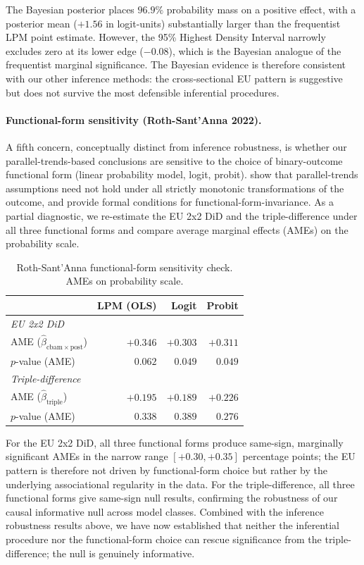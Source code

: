 \documentclass[11pt,a4paper]{article}
\begin{document}
The Bayesian posterior places $96.9\%$ probability mass on a positive effect, with a posterior mean ($+1.56$ in logit-units) substantially larger than the frequentist LPM point estimate. However, the 95\% Highest Density Interval narrowly excludes zero at its lower edge ($-0.08$), which is the Bayesian analogue of the frequentist marginal significance. The Bayesian evidence is therefore consistent with our other inference methods: the cross-sectional EU pattern is suggestive but does not survive the most defensible inferential procedures.

\paragraph{Functional-form sensitivity (Roth-Sant'Anna 2022).} A fifth concern, conceptually distinct from inference robustness, is whether our parallel-trends-based conclusions are sensitive to the choice of binary-outcome functional form (linear probability model, logit, probit). \citet{roth2022parallel} show that parallel-trends assumptions need not hold under all strictly monotonic transformations of the outcome, and provide formal conditions for functional-form-invariance. As a partial diagnostic, we re-estimate the EU 2x2 DiD and the triple-difference under all three functional forms and compare average marginal effects (AMEs) on the probability scale.

\begin{table}[ht]
\centering
\caption{Roth-Sant'Anna functional-form sensitivity check. AMEs on probability scale.}
\label{tab:ch8-funcform}
\begin{tabular}{lrrr}
\toprule
& LPM (OLS) & Logit & Probit \\
\midrule
\textit{EU 2x2 DiD} & & & \\
\quad AME ($\hat\beta_{\mathrm{cbam}\times \mathrm{post}}$) & $+0.346$ & $+0.303$ & $+0.311$ \\
\quad $p$-value (AME) & $0.062$ & $0.049$ & $0.049$ \\
\midrule
\textit{Triple-difference} & & & \\
\quad AME ($\hat\beta_{\mathrm{triple}}$) & $+0.195$ & $+0.189$ & $+0.226$ \\
\quad $p$-value (AME) & $0.338$ & $0.389$ & $0.276$ \\
\bottomrule
\end{tabular}
\end{table}

For the EU 2x2 DiD, all three functional forms produce same-sign, marginally significant AMEs in the narrow range $[+0.30, +0.35]$ percentage points; the EU pattern is therefore not driven by functional-form choice but rather by the underlying associational regularity in the data. For the triple-difference, all three functional forms give same-sign null results, confirming the robustness of our causal informative null across model classes. Combined with the inference robustness results above, we have now established that neither the inferential procedure nor the functional-form choice can rescue significance from the triple-difference; the null is genuinely informative.
\end{document}
